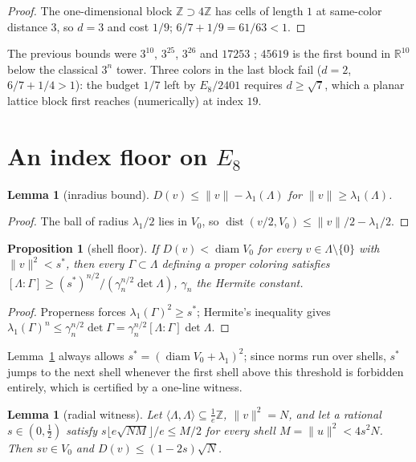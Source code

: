 \documentclass[10pt]{article}
\theoremstyle{plain}
\newtheorem{proposition}[theorem]{Proposition}
\newtheorem{lemma}[theorem]{Lemma}
\theoremstyle{remark}
\newcommand{\R}{\mathbb{R}}
\newcommand{\Z}{\mathbb{Z}}
\newcommand{\diam}{\operatorname{diam}}
\newcommand{\dist}{\operatorname{dist}}
\begin{document}
\begin{proof}
The one-dimensional block $\Z\supset4\Z$ has cells of length $1$ at
same-color distance $3$, so $d=3$ and cost $1/9$; $6/7+1/9=61/63<1$.
\end{proof}

The previous bounds were $3^{10}$, $3^{25}$, $3^{26}$ and $17253$
\cite{ABPR}; $45619$ is the first bound in $\R^{10}$ below the classical
$3^n$ tower. Three colors in the last block fail ($d=2$, $6/7+1/4>1$): the
budget $1/7$ left by $E_8/2401$ requires $d\ge\sqrt7$, which a planar
lattice block first reaches (numerically) at index $19$.

\section{An index floor on $E_8$}\label{sec:floor}

\begin{lemma}[inradius bound]\label{lem:inradius}
$D(v)\le\|v\|-\lambda_1(\Lambda)$ for $\|v\|\ge\lambda_1(\Lambda)$.
\end{lemma}

\begin{proof}
The ball of radius $\lambda_1/2$ lies in $V_0$, so
$\dist(v/2,V_0)\le\|v\|/2-\lambda_1/2$.
\end{proof}

\begin{proposition}[shell floor]\label{prop:shell}
If $D(v)<\diam V_0$ for every $v\in\Lambda\setminus\{0\}$ with
$\|v\|^2<s^*$, then every $\Gamma\subset\Lambda$ defining a proper coloring
satisfies $[\Lambda:\Gamma]\ge(s^*)^{n/2}/(\gamma_n^{n/2}\det\Lambda)$,
$\gamma_n$ the Hermite constant.
\end{proposition}

\begin{proof}
Properness forces $\lambda_1(\Gamma)^2\ge s^*$; Hermite's inequality gives
$\lambda_1(\Gamma)^n\le\gamma_n^{n/2}\det\Gamma=\gamma_n^{n/2}[\Lambda:\Gamma]\det\Lambda$.
\end{proof}

Lemma~\ref{lem:inradius} always allows $s^*=(\diam V_0+\lambda_1)^2$; since
norms run over shells, $s^*$ jumps to the next shell whenever the first shell
above this threshold is forbidden entirely, which is certified by a one-line
witness.

\begin{lemma}[radial witness]\label{lem:radial}
Let $\langle\Lambda,\Lambda\rangle\subseteq\frac1e\Z$, $\|v\|^2=N$, and let
a rational $s\in(0,\frac12)$ satisfy $s\lfloor e\sqrt{NM}\rfloor/e\le M/2$
for every shell $M=\|u\|^2<4s^2N$. Then $sv\in V_0$ and
$D(v)\le(1-2s)\sqrt N$.
\end{lemma}
\end{document}
